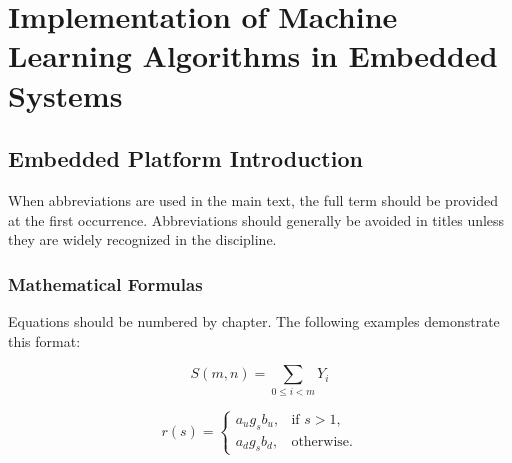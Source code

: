 \chapter{Implementation of Machine Learning Algorithms in Embedded Systems}

\section{Embedded Platform Introduction}
When abbreviations are used in the main text, the full term should be provided at the first occurrence. Abbreviations should generally be avoided in titles unless they are widely recognized in the discipline.

\subsection{Mathematical Formulas}
Equations should be numbered by chapter. The following examples demonstrate this format:

\begin{equation}
S(m,n)=\sum_{0\leq i<m}Y_i
\label{eq:sequence-sum}
\end{equation}

\begin{equation}
r(s)=
\begin{cases}
a_u g_s b_u, & \text{if } s>1,\\
a_d g_s b_d, & \text{otherwise}.
\end{cases}
\label{eq:piecewise}
\end{equation}
